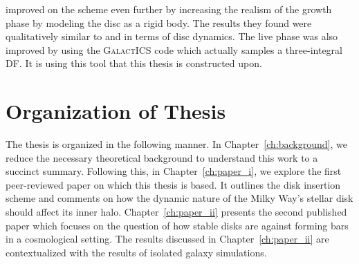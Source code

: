 \citet{bauer2018a} improved on the scheme even further by increasing the realism of the growth phase by modeling the disc as a rigid body. The results they found were qualitatively similar to \citet{debuhr_2012} and \citet{ys_2015}  in terms of disc dynamics. The live phase was also improved by using the \textsc{GalactICS} code which actually samples a three-integral DF. It is using this tool that this thesis is constructed upon.


\section{Organization of Thesis}

The thesis is organized in the following manner. In Chapter~\ref{ch:background}, we reduce the necessary theoretical background to understand this work to a succinct summary. Following this, in Chapter~\ref{ch:paper_i}, we explore the first peer-reviewed paper on which this thesis is based. It outlines the disk insertion scheme and comments on how the dynamic nature of the Milky Way's stellar disk should affect its inner halo. Chapter~\ref{ch:paper_ii} presents the second published paper which focuses on the question of how stable disks are against forming bars in a cosmological setting. The results discussed in Chapter~\ref{ch:paper_ii} are contextualized with the results of isolated galaxy simulations.


